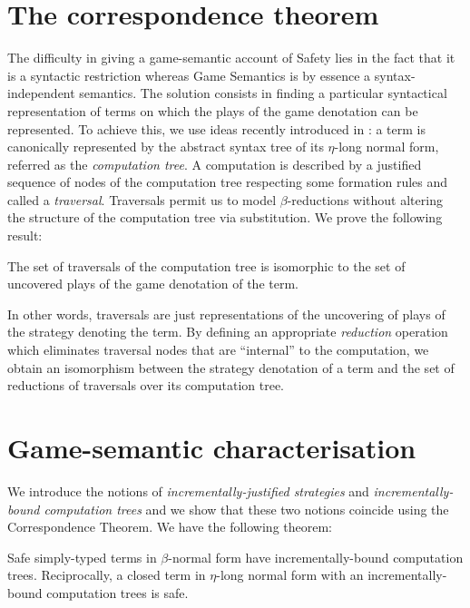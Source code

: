 \section{The correspondence theorem}

The difficulty in giving a game-semantic account of Safety lies in
the fact that it is a syntactic restriction whereas Game Semantics
is by essence a syntax-independent semantics. The solution consists
in finding a particular syntactical representation of terms on which
the plays of the game denotation can be represented.
 To achieve
this, we use ideas recently introduced in \cite{OngLics2006}: a term
is canonically represented by the abstract syntax tree of its
$\eta$-long normal form, referred as the \emph{computation tree}. A
computation is described by a justified sequence of nodes of the
computation tree respecting some formation rules and called a
\emph{traversal}. Traversals permit us to model $\beta$-reductions
without altering the structure of the computation tree via
substitution.
%
%
We prove the following result:
\begin{thm}
\label{thm:corresp} The set of traversals of the computation tree is
isomorphic to the set of uncovered plays of the game denotation of
the term.
\end{thm}

In other words, traversals are just representations of the
uncovering of plays of the strategy denoting the term. By defining
an appropriate \emph{reduction} operation which eliminates traversal
nodes that are ``internal'' to the computation, we obtain an
isomorphism between the strategy denotation of a term and the set of
reductions of traversals over its computation tree.

\section{Game-semantic characterisation}

We introduce the notions of \emph{incrementally-justified
strategies} and \emph{incrementally-bound computation trees} and we
show that these two notions coincide using the Correspondence
Theorem. We have the following theorem:

\begin{thm}
\label{thm:gamesem_charact} Safe simply-typed terms in
$\beta$-normal form have incrementally-bound computation trees.
Reciprocally, a closed term in $\eta$-long normal form with an
incrementally-bound computation trees is safe.
\end{thm}

